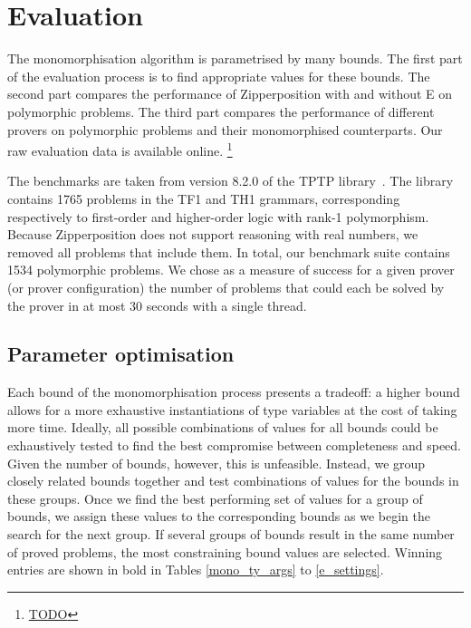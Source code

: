 \documentclass[runningheads]{llncs}
\begin{document}
\section{Evaluation}
\label{sec:evaluation}

The monomorphisation algorithm is parametrised by many bounds. The first part of the evaluation process is to find appropriate values for these bounds. The second part compares the performance of Zipperposition with and without E on polymorphic problems. The third part compares the performance of different provers on polymorphic problems and their monomorphised counterparts.
Our raw evaluation data is available online.%
\footnote{\url{TODO}}

The benchmarks are taken from version 8.2.0 of the TPTP library~\cite{tptp}. The library contains 1765 problems in the TF1 and TH1 grammars, corresponding respectively to first-order and higher-order logic with rank-1 polymorphism. Because Zipperposition does not support reasoning with real numbers, we removed all problems that include them. In total, our benchmark suite contains 1534 polymorphic problems. We chose as a measure of success for a given prover (or prover configuration) the number of problems that could each be solved by the prover in at most 30 seconds with a single thread.

\subsection{Parameter optimisation}
\label{param_opti}

Each bound of the monomorphisation process presents a tradeoff: a higher bound allows for a more exhaustive instantiations of type variables at the cost of taking more time. Ideally, all possible combinations of values for all bounds could be exhaustively tested to find the best compromise between completeness and speed. Given the number of bounds, however, this is unfeasible. Instead, we group closely related bounds together and test combinations of values for the bounds in these groups. Once we find the best performing set of values for a group of bounds, we assign these values to the corresponding bounds as we begin the search for the next group. If several groups of bounds result in the same number of proved problems, the most constraining bound values are selected. Winning entries are shown in bold in Tables \ref{mono_ty_args} to \ref{e_settings}.
\end{document}
